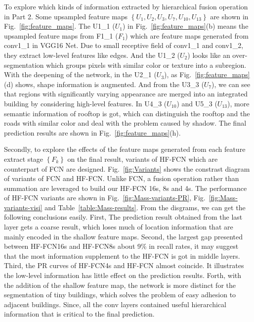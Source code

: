 To explore which kinds of information extracted by hierarchical fusion operation in Part 2. 
Some upsampled feature maps ${\left\{U_1,U_2,U_3,U_7,U_{10},U_{13}\right\}}$ are shown in Fig.~\ref{fig:feature_maps}. 
The U1\_1 (${U_1}$) in Fig.~\ref{fig:feature_maps}(b) means the upsampled feature maps from F1\_1 (${F_1}$) which are feature maps generated from conv1\_1 in VGG16 Net.
Due to small receptive field of conv1\_1 and conv1\_2, they extract low-level features like edges. 
And the U1\_2 (${U_2}$) looks like an over-segmentation which groups pixels with similar color or texture into a subregion.
With the deepening of the network, in the U2\_1 (${U_3}$), as Fig.~\ref{fig:feature_maps}(d) shows, shape information is augmented.
And from the U3\_3 (${U_7}$), we can see that regions with significantly varying appearance are merged into an integrated building by considering high-level features.
In U4\_3 (${U_{10}}$) and U5\_3 ($U_{13}$), more semantic information of rooftop is got, which can distinguish the rooftop and the roads with similar color and deal with the problem caused by shadow. 
The final prediction results are shown in Fig.~\ref{fig:feature_maps}(h).

Secondly, to explore the effects of the feature maps generated from each feature extract stage ${\left\{F_k\right\}}$ on the final result, variants of HF-FCN which are counterpart of FCN are designed.
Fig.~\ref{fig:Variants} shows the constrast diagram of variants of FCN and HF-FCN.
Unlike FCN, a fusion operation rather than summation are leveraged to build our HF-FCN 16s, 8s and 4s. 
The performance of HF-FCN variants are shown in Fig.~\ref{fig:Mass-variants-PR}, Fig.~\ref{fig:Mass-variants-visi} and Table~\ref{table:Mass-results}.
From the disgrams, we can get the following conclusions easily. First, The prediction result obtained from the last layer gets a coarse result, which loses much of location information that are mainly encoded in the shallow feature maps. Second, the largest gap presented between HF-FCN16s and HF-FCN8s about 9{\%} in recall rates, it may suggest that the most information supplement to the HF-FCN is got in middle layers. Third, the PR curves of HF-FCN4s and HF-FCN almost coincide. It illustrates the low-level information has little effect on the prediction results. Forth, with the addition of the shallow feature map, the network is more distinct for the segmentation of tiny buildings, which solves the problem of easy adhesion to adjacent buildings. Since, all the conv layers contained useful hierarchical information that is critical to the final prediction.

